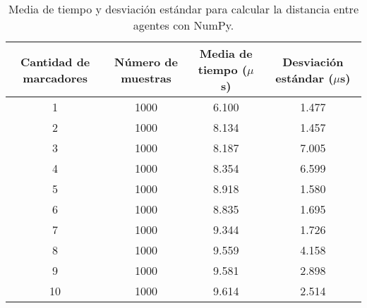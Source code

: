 \begin{table}[H]
	\centering
	\resizebox{\textwidth}{!} {
	\begin{tabular}{|c|c|c|c|}
		\hline
		\textbf{Cantidad de marcadores} & \textbf{Número de muestras} & \textbf{Media de tiempo ($\mu$s)} & \textbf{Desviación estándar ($\mu$s)} \\ \hline
		1                               & 1000                        & 6.100                         & 1.477                             \\ \hline
		2                               & 1000                        & 8.134                         & 1.457                             \\ \hline
		3                               & 1000                        & 8.187                         & 7.005                             \\ \hline
		4                               & 1000                        & 8.354                         & 6.599                             \\ \hline
		5                               & 1000                        & 8.918                         & 1.580                             \\ \hline
		6                               & 1000                        & 8.835                         & 1.695                             \\ \hline
		7                               & 1000                        & 9.344                         & 1.726                             \\ \hline
		8                               & 1000                        & 9.559                         & 4.158                             \\ \hline
		9                               & 1000                        & 9.581                         & 2.898                             \\ \hline
		10                              & 1000                        & 9.614                         & 2.514                             \\ \hline
	\end{tabular}}
	\caption{Media de tiempo y desviación estándar para calcular la distancia entre agentes con NumPy.}
	\label{cuadro:tiempos_distancias_numpy}
\end{table}

